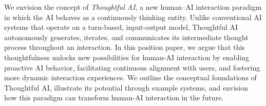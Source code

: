 

We envision the concept of \textit{Thoughtful AI}, a new human–AI interaction paradigm in which the AI behaves as a continuously thinking entity.
Unlike conventional AI systems that operate on a turn-based, input-output model, Thoughtful AI autonomously generates, iterates, and communicates its intermediate thought process throughout an interaction.
In this position paper, we argue that this thoughtfulness unlocks new possibilities for human-AI interaction by enabling proactive AI behavior, facilitating continuous alignment with users, and fostering more dynamic interaction experiences.
We outline the conceptual foundations of Thoughtful AI, illustrate its potential through example systems, and envision how this paradigm can transform human-AI interaction in the future.

